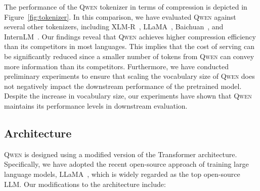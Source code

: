 The performance of the \textsc{Qwen} tokenizer in terms of compression is depicted in Figure~\ref{fig:tokenizer}. In this comparison, we have evaluated \textsc{Qwen} against several other tokenizers, including XLM-R~\citep{xlmr}, LLaMA~\citep{llama}, Baichuan~\citep{baichuan7b}, and InternLM~\citep{internlm}. Our findings reveal that \textsc{Qwen} achieves higher compression efficiency than its competitors in most languages. This implies that the cost of serving can be significantly reduced since a smaller number of tokens from \textsc{Qwen} can convey more information than its competitors. Furthermore, we have conducted preliminary experiments to ensure that scaling the vocabulary size of \textsc{Qwen} does not negatively impact the downstream performance of the pretrained model. Despite the increase in vocabulary size, our experiments have shown that \textsc{Qwen} maintains its performance levels in downstream evaluation. 

\subsection{Architecture}

\textsc{Qwen} is designed using a modified version of the Transformer architecture. Specifically, we have adopted the recent open-source approach of training large language models, LLaMA~\citep{llama}, which is widely regarded as the top open-source LLM. Our modifications to the architecture include:

